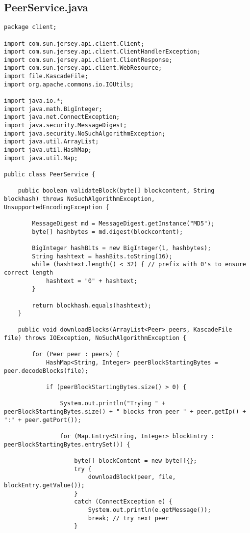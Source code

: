 \documentclass{acm_proc_article-sp}
\begin{document}
\subsection{PeerService.java}
\begin{lstlisting}
package client;

import com.sun.jersey.api.client.Client;
import com.sun.jersey.api.client.ClientHandlerException;
import com.sun.jersey.api.client.ClientResponse;
import com.sun.jersey.api.client.WebResource;
import file.KascadeFile;
import org.apache.commons.io.IOUtils;

import java.io.*;
import java.math.BigInteger;
import java.net.ConnectException;
import java.security.MessageDigest;
import java.security.NoSuchAlgorithmException;
import java.util.ArrayList;
import java.util.HashMap;
import java.util.Map;

public class PeerService {

    public boolean validateBlock(byte[] blockcontent, String blockhash) throws NoSuchAlgorithmException, UnsupportedEncodingException {

        MessageDigest md = MessageDigest.getInstance("MD5");
        byte[] hashbytes = md.digest(blockcontent);

        BigInteger hashBits = new BigInteger(1, hashbytes);
        String hashtext = hashBits.toString(16);
        while (hashtext.length() < 32) { // prefix with 0's to ensure correct length
            hashtext = "0" + hashtext;
        }

        return blockhash.equals(hashtext);
    }

    public void downloadBlocks(ArrayList<Peer> peers, KascadeFile file) throws IOException, NoSuchAlgorithmException {

        for (Peer peer : peers) {
            HashMap<String, Integer> peerBlockStartingBytes = peer.decodeBlocks(file);

            if (peerBlockStartingBytes.size() > 0) {

                System.out.println("Trying " + peerBlockStartingBytes.size() + " blocks from peer " + peer.getIp() + ":" + peer.getPort());

                for (Map.Entry<String, Integer> blockEntry : peerBlockStartingBytes.entrySet()) {

                    byte[] blockContent = new byte[]{};
                    try {
                        downloadBlock(peer, file, blockEntry.getValue());
                    }
                    catch (ConnectException e) {
                        System.out.println(e.getMessage());
                        break; // try next peer
                    }


\end{lstlisting}
\end{document}
